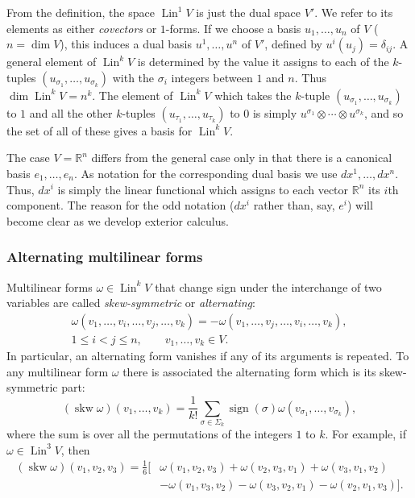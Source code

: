 {From the definition, the space $\operatorname{Lin}^1V$ is just the dual space $V'$. We refer to its elements as either \emph{covectors} or $1$-forms. If we choose a basis $u_1,\ldots,u_n$ of $V$ ($n=\dim V$), this induces a dual basis $u^1,\ldots,u^n$ of $V'$, defined by $u^i(u_j)=\delta_{ij}$. A general element of $\operatorname{Lin}^kV$ is determined by the value it assigns to each of the $k$-tuples $(u_{\sigma_1},\ldots,u_{\sigma_k})$ with the $\sigma_i$ integers between $1$ and $n$. Thus $\dim\operatorname{Lin}^kV=n^k$. The element of $\operatorname{Lin}^kV$ which takes the $k$-tuple $(u_{\sigma_1},\ldots,u_{\sigma_k})$ to $1$ and all the other $k$-tuples $(u_{\tau_1},\ldots,u_{\tau_k})$ to $0$ is simply $u^{\sigma_1}\otimes\cdots\otimes u^{\sigma_k}$, and so the set of all of these gives a basis for $\operatorname{Lin}^kV$.}

{The case $V=\mathbb R^n$ differs from the general case only in that there is a canonical basis $e_1,\ldots,e_n$. As notation for the corresponding dual basis we use $dx^1,\ldots,dx^n$. Thus, $dx^i$ is simply the linear functional which assigns to each vector $\mathbb R^n$ its $i$th component. The reason for the odd notation ($dx^i$ rather than, say, $e^i$) will become clear as we develop exterior calculus.}

\subsubsection{{Alternating multilinear forms}}\label{subsec:alternating-multilinear-forms}

{Multilinear forms $\omega\in\operatorname{Lin}^kV$ that change sign under the interchange of two variables are called \emph{skew-symmetric} or \emph{alternating}:}
\[
\begin{gathered}
\omega(v_1,\ldots,v_i,\ldots,v_j,\ldots,v_k)=-\omega(v_1,\ldots,v_j,\ldots,v_i,\ldots,v_k),\\
1\leq i<j\leq n,\qquad v_1,\ldots,v_k\in V.
\end{gathered}
\]
{In particular, an alternating form vanishes if any of its arguments is repeated. To any multilinear form $\omega$ there is associated the alternating form which is its skew-symmetric part:}
\[
(\operatorname{skw}\omega)(v_1,\ldots,v_k)=\frac1{k!}\sum_{\sigma\in\Sigma_k}\operatorname{sign}(\sigma)\omega(v_{\sigma_1},\ldots,v_{\sigma_k}),
\]
{where the sum is over all the permutations of the integers $1$ to $k$. For example, if $\omega\in\operatorname{Lin}^3V$, then}
\[
\begin{aligned}
(\operatorname{skw}\omega)(v_1,v_2,v_3)=\frac16[&\omega(v_1,v_2,v_3)+\omega(v_2,v_3,v_1)+\omega(v_3,v_1,v_2)\\
&-\omega(v_1,v_3,v_2)-\omega(v_3,v_2,v_1)-\omega(v_2,v_1,v_3)].
\end{aligned}
\]

